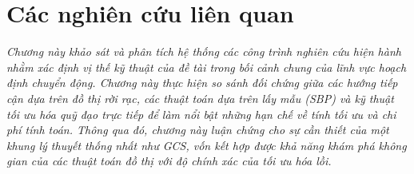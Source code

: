 \chapter{Các nghiên cứu liên quan}
\indent\textit{
Chương này khảo sát và phân tích hệ thống các công trình nghiên cứu hiện hành nhằm xác định vị thế kỹ thuật của đề tài trong bối cảnh chung của lĩnh vực hoạch định chuyển động. Chương này thực hiện so sánh đối chứng giữa các hướng tiếp cận dựa trên đồ thị rời rạc, các thuật toán dựa trên lấy mẫu (SBP) và kỹ thuật tối ưu hóa quỹ đạo trực tiếp để làm nổi bật những hạn chế về tính tối ưu và chi phí tính toán. Thông qua đó, chương này luận chứng cho sự cần thiết của một khung lý thuyết thống nhất như GCS, vốn kết hợp được khả năng khám phá không gian của các thuật toán đồ thị với độ chính xác của tối ưu hóa lồi.
}



% 
